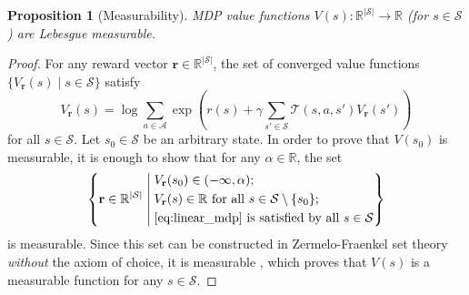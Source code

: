 \documentclass{mpaper}
\newtheorem{proposition}[theorem]{Proposition}
\newcommand{\V}{V_{\mathbf{r}}}
\begin{document}
\begin{proposition}[Measurability] \label{thm:measurability}
  MDP value functions $V(s) : \mathbb{R}^{|\mathcal{S}|} \to \mathbb{R}$ (for $s
  \in \mathcal{S}$) are Lebesgue measurable.
\end{proposition}
\begin{proof}
  For any reward vector $\mathbf{r} \in \mathbb{R}^{|\mathcal{S}|}$, the
  set of converged value functions $\{ \V(s) \mid s \in
  \mathcal{S} \}$ satisfy
  \begin{equation} \label{eq:linear_mdp}
    \V(s) = \log \sum_{a \in \mathcal{A}}
    \exp\left( r(s) + \gamma\sum_{s' \in \mathcal{S}} \mathcal{T}(s, a,
      s')\V(s') \right)
  \end{equation}
  for all $s \in \mathcal{S}$. Let $s_0 \in \mathcal{S}$ be an arbitrary state.
  In order to prove that $V(s_0)$ is measurable, it is enough to show that for
  any $\alpha \in \mathbb{R}$, the set
  \[
    \left\{ \mathbf{r} \in \mathbb{R}^{|\mathcal{S}|} \; \middle|
    \begin{aligned}
      \;&\V(s_0) \in (-\infty, \alpha); \\
      \;&\V(s) \in \mathbb{R} \text{ for all } s \in \mathcal{S} \setminus \{ s_0 \}; \\
      \;&\text{\eqref{eq:linear_mdp} is satisfied by all } s \in
      \mathcal{S}
    \end{aligned}
    \right\}
  \]
  is measurable. Since this set can be constructed in Zermelo-Fraenkel set
  theory \emph{without} the axiom of choice, it is measurable
  \cite{herrlich2006axiom}, which proves that $V(s)$ is a measurable function
  for any $s \in \mathcal{S}$.
\end{proof}
\end{document}
